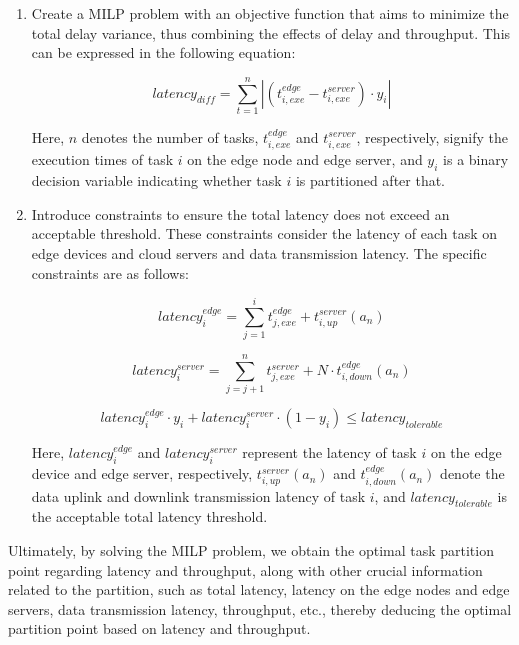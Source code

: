 \documentclass[preprint,12pt,authoryear]{elsarticle}
\begin{document}
\begin{enumerate}
    \item Create a MILP problem with an objective function that aims to minimize the total delay variance, thus combining the effects of delay and throughput. This can be expressed in the following equation:

    \begin{equation}
        latency_{diff}=\sum^n_{t=1}|(t_{i,exe}^{edge}-t_{i,exe}^{server})\cdot y_i|
    \end{equation}

    Here, \(n\) denotes the number of tasks, \(t_{i,exe}^{edge}\) and \(t_{i,exe}^{server}\), respectively, signify the execution times of task \(i\) on the edge node and edge server, and \(y_i\) is a binary decision variable indicating whether task \(i\) is partitioned after that.

    \item Introduce constraints to ensure the total latency does not exceed an acceptable threshold. These constraints consider the latency of each task on edge devices and cloud servers and data transmission latency. The specific constraints are as follows:

    \begin{equation}
    latency_i^{edge}=\sum^i_{j=1}t_{j,exe}^{edge}+t_{i,up}^{server}(a_n)
    \end{equation}

    \begin{equation}
        latency_i^{server} = \sum^n_{j=j+1}t_{j,exe}^{server}+N\cdot t_{i,down}^{edge}(a_n)
    \end{equation}
    
    \begin{equation}
        latency_i^{edge}\cdot y_i+latency_i^{server}\cdot(1-y_i)\leq latency_{tolerable}
    \end{equation}

    Here, \(latency_i^{edge}\) and \(latency_i^{server}\) represent the latency of task \(i\) on the edge device and edge server, respectively, \(t_{i,up}^{server}(a_n)\) and \(t_{i,down}^{edge}(a_n)\) denote the data uplink and downlink transmission latency of task \(i\), and \(latency_{tolerable}\) is the acceptable total latency threshold.
    
\end{enumerate}

Ultimately, by solving the MILP problem, we obtain the optimal task partition point regarding latency and throughput, along with other crucial information related to the partition, such as total latency, latency on the edge nodes and edge servers, data transmission latency, throughput, etc., thereby deducing the optimal partition point based on latency and throughput.
\end{document}
